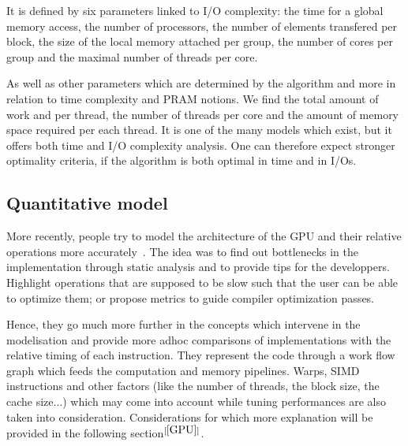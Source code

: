 It is defined by six parameters linked to I/O complexity: the time for a global memory access, the number of processors, the number of elements transfered per block, the size of the local memory attached per group, the number of cores per group and the maximal number of threads per core.

As well as other parameters which are determined by the algorithm and more in relation to time complexity and PRAM notions. We find the total amount of work and per thread, the number of threads per core and the amount of memory space required per each thread. It is one of the many models which exist, but it offers both time and I/O complexity analysis. One can therefore expect stronger optimality criteria, if the algorithm is both optimal in time and in I/Os.

\subsection{Quantitative model}

More recently, people try to model the architecture of the GPU and their relative operations more accurately~\cite{baghsorkhi2010adaptive,hong2009analytical}. The idea was to find out bottlenecks in the implementation through static analysis and to provide tips for the developpers. Highlight operations that are supposed to be slow such that the user can be able to optimize them; or propose metrics to guide compiler optimization passes.

Hence, they go much more further in the concepts which intervene in the modelisation and provide more adhoc comparisons of implementations with the relative timing of each instruction. They represent the code through a work flow graph which feeds the computation and memory pipelines. Warps, SIMD instructions and other factors (like the number of threads, the block size, the cache size...) which may come into account while tuning performances are also taken into consideration. Considerations for which more explanation will be provided in the following section$^{[\ref{GPU}]}$.
